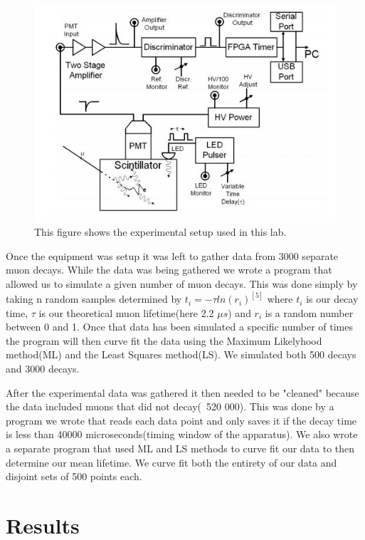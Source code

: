 \documentclass{article}
\begin{document}
\begin{figure}[H]
\includegraphics[scale=0.75,center]{MuonSetup.JPG}
\caption{This figure shows the experimental setup used in this lab.}
\end{figure}

Once the equipment was setup it was left to gather data from 3000 separate muon decays.  While the data was being gathered we wrote a program that allowed us to simulate a given number of muon decays.  This was done simply by taking n random samples determined by $t_i=-\tau ln(r_i)^{[5]}$ where $t_i$ is our decay time, $\tau$ is our theoretical muon lifetime(here 2.2 $\mu s$) and $r_i$ is a random number between 0 and 1.  Once that data has been simulated a specific number of times the program will then curve fit the data using the Maximum Likelyhood method(ML) and the Least Squares method(LS).  We simulated both 500 decays and 3000 decays.

After the experimental data was gathered it then needed to be "cleaned" because the data included muons that did not decay(~520 000).  This was done by a program we wrote that reads each data point and only saves it if the decay time is less than 40000 microseconds(timing window of the apparatus).  We also wrote a separate program that used ML and LS methods to curve fit our data to then determine our mean lifetime.  We curve fit both the entirety of our data and disjoint sets of 500 points each.

\section{Results}
\end{document}
